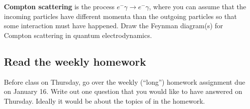 \documentclass[12pt]{article}
\numberwithin{equation}{section}    %
\begin{document}
\textbf{Compton scattering} is the process $e^- \gamma \to e^- \gamma$, where you can assume that the incoming particles have different momenta than the outgoing particles so that some interaction must have happened. Draw the Feynman diagram(s) for Compton scattering in quantum electrodynamics. 

\subsection{Read the weekly homework}

Before class on Thursday, go over the weekly (``long'') homework assignment due on January 16. Write out one question that you would like to have answered on Thursday. Ideally it would be about the topics of in the homework.
\end{document}
